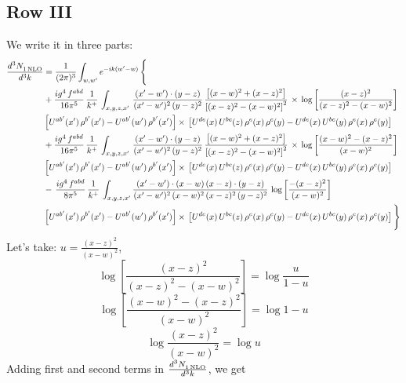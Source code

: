 \documentclass[9pt]{article}
\numberwithin{equation}{section}
\begin{document}
\subsection{Row III}
We write it in three parts:
\begin{align}
   \frac{d^{3}N_{1\,\rm NLO}^{\rm}}{d^{3}k}  & =  \frac{1}{(2\pi)^{3}}  \int_{w, w^\prime} e^{-ik(w^\prime-w)}\, \Bigg\{\notag \\
&  +\frac{ig^{4}\,f^{abd}}{16\pi^{5}}\, \frac{1}{k^{+}}\,\int_{x,y,z,x'}\, \frac{(x'-w')\cdot (y-z)}{(x'-w')^{2}\,(y-z)^{2}}\, \frac{\left[(x-w)^{2}+(x-z)^{2}\right]}{\left[(x-z)^{2}-(x-w)^{2}\right]^{2}}\, \times\, \log{\left[\frac{(x-z)^{2}}{(x-z)^{2}-(x-w)^{2}}\right]}\notag \\ & \left[U^{ab'}(x')\,\rho^{b'}(x')-U^{ab'}(w')\, \rho^{b'}(x')\right]\times\, \left[U^{de}(x)\,U^{bc}(z)\, \rho^{e}(x)\,\rho^{c}(y)-U^{de}(x)\,U^{bc}(y)\,\rho^{e}(x)\,\rho^{c}(y)\right] \notag \\
&  +\frac{ig^{4}\,f^{abd}}{16\pi^{5}}\, \frac{1}{k^{+}}\,\int_{x,y,z,x'}\, \frac{(x'-w')\cdot (y-z)}{(x'-w')^{2}\,(y-z)^{2}}\, \frac{\left[(x-w)^{2}+(x-z)^{2}\right]}{\left[(x-z)^{2}-(x-w)^{2}\right]^{2}}\, \times\, \log{\left[\frac{(x-w)^{2}-(x-z)^{2}}{(x-w)^{2}}\right]}\notag \\ & \left[U^{ab'}(x')\,\rho^{b'}(x')-U^{ab'}(w')\, \rho^{b'}(x')\right]\times\, \left[U^{de}(x)\,U^{bc}(z)\, \rho^{e}(x)\,\rho^{c}(y)-U^{de}(x)\,U^{bc}(y)\,\rho^{e}(x)\,\rho^{c}(y)\right] \notag \\
&-\, \frac{ig^{4}\,f^{abd}}{8\pi^{5}}\,\frac{1}{k^{+}}\,\int_{x,y,z,x'}\frac{(x'-w')\cdot (x-w)\, (x-z)\cdot (y-z)}{(x'-w')^{2}\, (x-w)^{2}\, (x-z)^{2}\, (y-z)^{2}}\,\log{\left[\frac{-(x-z)^{2}}{(x-w)^{2}}\right]} \notag \\ & \left[U^{ab'}(x')\,\rho^{b'}(x')-U^{ab'}(w')\, \rho^{b'}(x')\right]\times\, \left[U^{de}(x)\,U^{bc}(z)\, \rho^{e}(x)\,\rho^{c}(y)-U^{de}(x)\,U^{bc}(y)\,\rho^{e}(x)\,\rho^{c}(y)\right]\Bigg\}
\end{align}
Let's take: $u = \frac{(x-z)^{2}}{(x-w)^{2}}$,
$$ \log{\left[\frac{(x-z)^{2}}{(x-z)^{2}-(x-w)^{2}}\right]} = \log{\frac{u}{1-u}} $$
$$\log{\left[\frac{(x-w)^{2}-(x-z)^{2}}{(x-w)^{2}}\right]} = \log{1-u}$$
$$\log{\frac{(x-z)^{2}}{(x-w)^{2}}} = \log{u}$$
Adding first and second terms in $ \frac{d^{3}N_{1\,\rm NLO}^{\rm}}{d^{3}k} $, we get
\end{document}
